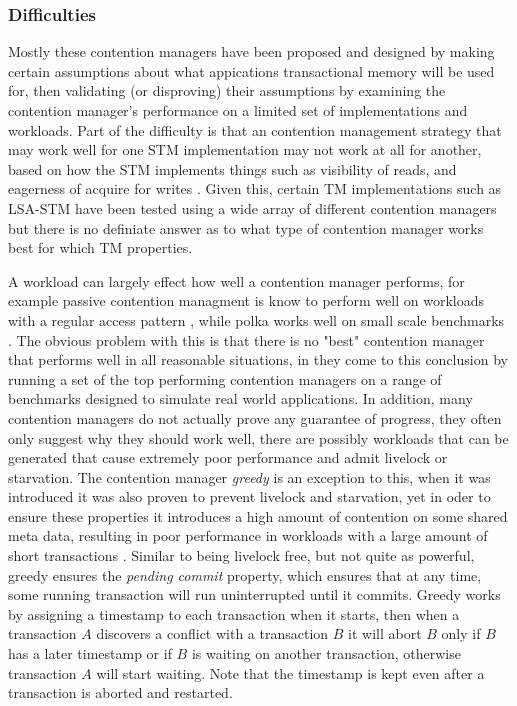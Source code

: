 \subsubsection{Difficulties}
Mostly these contention managers have been proposed and designed by making certain assumptions about what appications transactional memory will be used for, then validating (or disproving) their assumptions by examining the contention manager's performance on a limited set of implementations and workloads.
Part of the difficulty is that an contention management strategy that may work well for one STM implementation may not work at all for another, based on how the STM implements things such as visibility of reads, and eagerness of acquire for writes \cite{1542494}.
Given this, certain TM implementations such as LSA-STM have been tested using a wide array of different contention managers \cite{10.1109/TPDS.2010.49} but there is no definiate answer as to what type of contention manager works best for which TM properties.

A workload can largely effect how well a contention manager performs, for example passive contention managment is know to perform well on workloads with a regular access pattern \cite{1504199}, while polka \cite{1073861} works well on small scale benchmarks \cite{1542494}.
The obvious problem with this is that there is no "best" contention manager that performs well in all reasonable situations, in \cite{guerraoui05polymorphic/LPD} they come to this conclusion by running a set of the top performing contention managers on a range of benchmarks designed to simulate real world applications.
In addition, many contention managers do not actually prove any guarantee of progress, they often only suggest why they should work well, there are possibly workloads that can be generated that cause extremely poor performance and admit livelock or starvation.
The contention manager \emph{greedy} \cite{1073863} is an exception to this, when it was introduced it was also proven to prevent livelock and starvation, yet in oder to ensure these properties it introduces a high amount of contention on some shared meta data, resulting in poor performance in workloads with a large amount of short transactions \cite{1542494}.
Similar to being livelock free, but not quite as powerful, greedy ensures the \emph{pending commit} property, which ensures that at any time, some running transaction will run uninterrupted until it commits.
Greedy works by assigning a timestamp to each transaction when it starts, then when a transaction $A$ discovers a conflict with a transaction $B$ it will abort $B$ only if $B$ has a later timestamp or if $B$ is waiting on another transaction, otherwise transaction $A$ will start waiting.
Note that the timestamp is kept even after a transaction is aborted and restarted.

